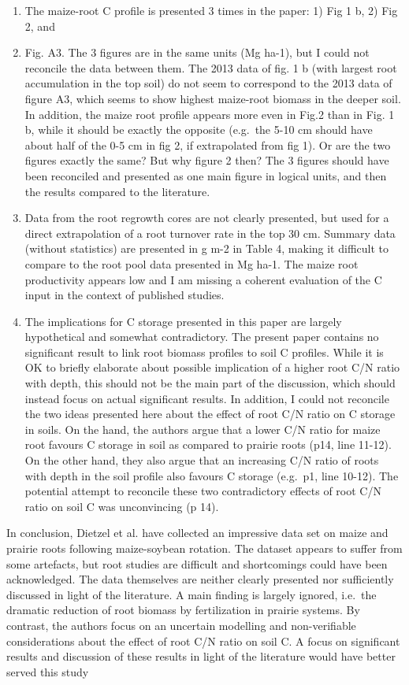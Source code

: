 \documentclass[]{article}
\begin{document}
\begin{enumerate}
\def\labelenumi{\arabic{enumi})}
\setcounter{enumi}{1}
\item
  The maize-root C profile is presented 3 times in the paper: 1) Fig 1
  b, 2) Fig 2, and
\item
  Fig. A3. The 3 figures are in the same units (Mg ha-1), but I could
  not reconcile the data between them. The 2013 data of fig. 1 b (with
  largest root accumulation in the top soil) do not seem to correspond
  to the 2013 data of figure A3, which seems to show highest maize-root
  biomass in the deeper soil. In addition, the maize root profile
  appears more even in Fig.2 than in Fig. 1 b, while it should be
  exactly the opposite (e.g.~the 5-10 cm should have about half of the
  0-5 cm in fig 2, if extrapolated from fig 1). Or are the two figures
  exactly the same? But why figure 2 then? The 3 figures should have
  been reconciled and presented as one main figure in logical units, and
  then the results compared to the literature.
\item
  Data from the root regrowth cores are not clearly presented, but used
  for a direct extrapolation of a root turnover rate in the top 30 cm.
  Summary data (without statistics) are presented in g m-2 in Table 4,
  making it difficult to compare to the root pool data presented in Mg
  ha-1. The maize root productivity appears low and I am missing a
  coherent evaluation of the C input in the context of published
  studies.
\item
  The implications for C storage presented in this paper are largely
  hypothetical and somewhat contradictory. The present paper contains no
  significant result to link root biomass profiles to soil C profiles.
  While it is OK to briefly elaborate about possible implication of a
  higher root C/N ratio with depth, this should not be the main part of
  the discussion, which should instead focus on actual significant
  results. In addition, I could not reconcile the two ideas presented
  here about the effect of root C/N ratio on C storage in soils. On the
  hand, the authors argue that a lower C/N ratio for maize root favours
  C storage in soil as compared to prairie roots (p14, line 11-12). On
  the other hand, they also argue that an increasing C/N ratio of roots
  with depth in the soil profile also favours C storage (e.g.~p1, line
  10-12). The potential attempt to reconcile these two contradictory
  effects of root C/N ratio on soil C was unconvincing (p 14).
\end{enumerate}

In conclusion, Dietzel et al. have collected an impressive data set on
maize and prairie roots following maize-soybean rotation. The dataset
appears to suffer from some artefacts, but root studies are difficult
and shortcomings could have been acknowledged. The data themselves are
neither clearly presented nor sufficiently discussed in light of the
literature. A main finding is largely ignored, i.e.~the dramatic
reduction of root biomass by fertilization in prairie systems. By
contrast, the authors focus on an uncertain modelling and non-verifiable
considerations about the effect of root C/N ratio on soil C. A focus on
significant results and discussion of these results in light of the
literature would have better served this study
\end{document}
